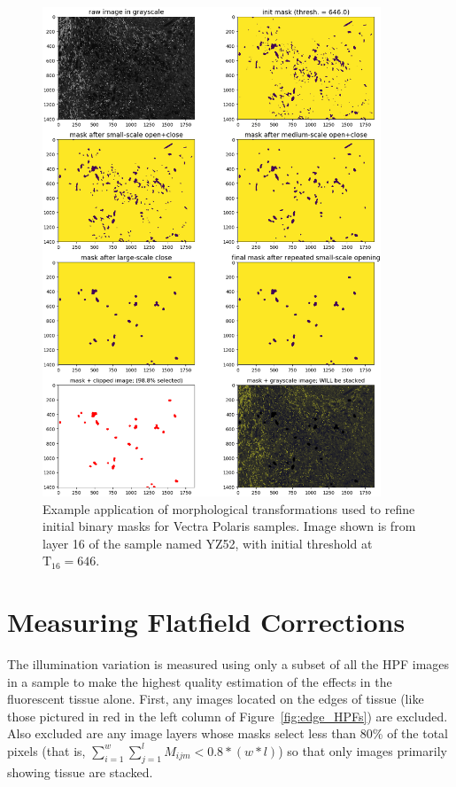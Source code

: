 \documentclass[letterpaper,11pt]{article}
\newcommand{\reffig}[1]{Figure~\ref{#1}}
\newcommand{\Tau}{\mathrm{T}}
\begin{document}
\begin{figure}[!ht]
\centering
\includegraphics[width=0.9\textwidth]{images/masking/image_16_layer_16_masks}
\caption{\footnotesize Example application of morphological transformations used to refine initial binary masks for Vectra Polaris samples. Image shown is from layer 16 of the sample named YZ52, with initial threshold at $\Tau_{16}=646$.}
\label{fig:mask_example_polaris_max}
\end{figure}

\clearpage

\section{Measuring Flatfield Corrections}
\label{sec:measuring_flatfield_corrections}

The illumination variation is measured using only a subset of all the HPF images in a sample to make the highest quality estimation of the effects in the fluorescent tissue alone. First, any images located on the edges of tissue (like those pictured in red in the left column of \reffig{fig:edge_HPFs}) are excluded. Also excluded are any image layers whose masks select less than 80\% of the total pixels (that is, $\sum_{i=1}^{w}\sum_{j=1}^{l}M_{ijm}<0.8*(w*l)$) so that only images primarily showing tissue are stacked. 
\end{document}
